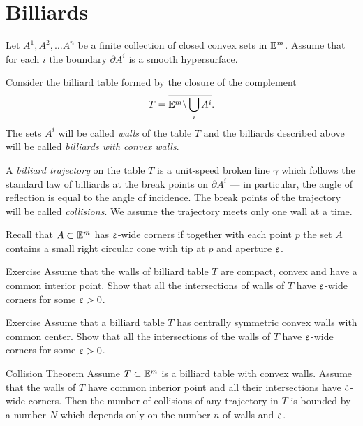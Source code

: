 \section{Billiards}

Let $A^1,A^2,\dots A^n$ be a finite collection of closed convex sets in $\mathbb{E}^m$.
Assume that for each $i$
the boundary $\partial A^i$ is a smooth hypersurface.

Consider the billiard table formed by the closure of the complement 
$$T=\overline{\mathbb{E}^m\backslash \bigcup_{i} A^i}.$$
The sets $A^i$ will be called \emph{walls} of the table $T$ 
and the billiards described above will be called \emph{billiards with convex walls}.

A \emph{billiard trajectory} 
on the table $T$ is a unit-speed broken line $\gamma$ 
which follows  the
standard law of billiards 
at the break points on $\partial A^i$ 
--- in particular, the angle of reflection is equal to the angle of incidence.
The break points of the trajectory will be called \emph{collisions}.
We assume the trajectory meets only one wall at a time.

Recall that $A\subset \EE^m$ has $\upvarepsilon$-wide corners
if together with each point $p$
the set $A$ contains a small right circular cone
with tip at $p$ and aperture $\upvarepsilon$.


\begin{thm}{Exercise}\label{ex:compact-walls}
Assume that the walls
of billiard table $T$ 
are compact, convex and have a common  interior point.
Show that all the intersections of  walls of $T$ have $\upvarepsilon$-wide corners for some $\upvarepsilon>0$.
\end{thm}

\begin{thm}{Exercise}\label{ex:centrally-simmetric-walls}
Assume that a billiard table $T$ has
centrally symmetric convex walls with common center.
Show that all the intersections of the walls of $T$  have $\upvarepsilon$-wide corners for some $\upvarepsilon>0$.
\end{thm}

\begin{thm}{Collision Theorem}\label{thm:collision}
Assume $T\subset\EE^m$
is a billiard table with convex walls.
Assume that the walls of $T$ have common interior point 
and all their intersections have $\upvarepsilon$-wide corners.
Then the number of collisions of any trajectory in  $T$  is bounded
by a number $N$ which depends only on the number $n$ of walls and $\upvarepsilon$.
\end{thm}

